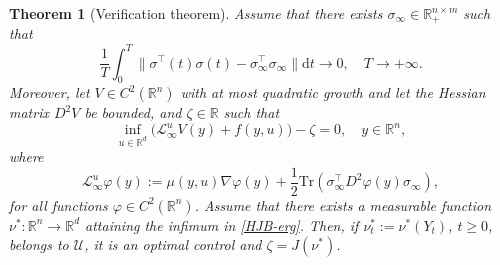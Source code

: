 \documentclass[a4paper,10pt]{article}
\newcommand{\D}{\mathrm{d}}
\newtheorem{theorem}{Theorem}[section]
\theoremstyle{definition}
\theoremstyle{plain}
\numberwithin{equation}{section}
\begin{document}
\begin{theorem}[Verification theorem] Assume that there exists $\sigma_\infty \in \mathbb R_+^{n \times m}$ such that
\begin{equation}\label{lim-sigma} \frac{1}{T}\int_0 ^T \| \sigma^\top (t)\sigma (t) - \sigma^\top _\infty\sigma_\infty \| \D t \to 0, \quad T \to +\infty.\end{equation}
Moreover, let $V \in C^2 (\mathbb R^n)$ with at most quadratic growth and let the Hessian matrix $D^2 V$ be bounded, and $\zeta \in \mathbb R$ such that
\begin{equation}\label{HJB-erg}
\inf_{u \in \mathbb R^d} \big (\mathcal L_\infty ^u V(y) + f(y,u)\big) - \zeta = 0, \quad y \in \mathbb R^n,
\end{equation}
where
\[ \mathcal L_\infty ^{u} \varphi (y):= \mu(y,u) \nabla \varphi (y) + \frac12 \text{Tr} \left( \sigma^\top _\infty D^2 \varphi(y) \sigma_\infty \right) ,\]
for all functions $\varphi \in C^2(\mathbb R^n)$.
Assume that there exists a measurable function $\nu^*: \mathbb R^n \to \mathbb R^d$ attaining the infimum in \eqref{HJB-erg}. 
Then, if $\nu^*_t := \nu^*(Y_t)$, $t\geq 0$, belongs to $\mathcal U$, it is an optimal control and $\zeta = J(\nu^*)$.
\end{theorem}
\end{document}
